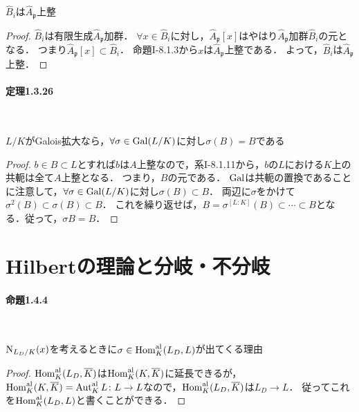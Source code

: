 \begin{screen}
  $\widehat{B}_i$は$\widehat{A}_\mathfrak{p}$上整
\end{screen}
\begin{proof}
  $\widehat{B}_i$は有限生成$\widehat{A}_\mathfrak{p}$加群．
  $\forall x\in\widehat{B}_i$に対し，$\widehat{A}_\mathfrak{p}[x]$はやはり$\widehat{A}_\mathfrak{p}$加群$\widehat{B}_i$の元となる．
  つまり$\widehat{A}_\mathfrak{p}[x]\subset\widehat{B}_i$．
  命題I-8.1.3から$x$は$\widehat{A}_\mathfrak{p}$上整である．
  よって，$\widehat{B}_i$は$\widehat{A}_\mathfrak{p}$上整．
\end{proof}

\paragraph{定理1.3.26}~
\begin{screen}
  \begin{lem}\label{sigmaB}
    $L/K$がGalois拡大なら，$\forall\sigma\in\operatorname{Gal}(L/K)$に対し$\sigma(B) = B$である
  \end{lem}
\end{screen}
\begin{proof}
  $b\in B\subset L$とすれば$b$は$A$上整なので，系I-8.1.11から，$b$の$L$における$K$上の共軛は全て$A$上整となる．
  つまり，$B$の元である．
  $\operatorname{Gal}$は共軛の置換であることに注意して，$\forall\sigma\in\operatorname{Gal}(L/K)$に対し$\sigma(B)\subset B$．
  両辺に$\sigma$をかけて$\sigma^2(B)\subset\sigma(B)\subset B$．
  これを繰り返せば，$B = \sigma^{[L:K]}(B)\subset\cdots\subset B$となる．従って，$\sigma B = B$．
\end{proof}

\section{Hilbertの理論と分岐・不分岐}
\paragraph{命題1.4.4}~
\begin{screen}
  $\operatorname{N}_{L_D/K}(x)$を考えるときに$\sigma\in\operatorname{Hom}_K^\text{al}(L_D, L)$が出てくる理由
\end{screen}
\begin{proof}
  $\operatorname{Hom}_K^\text{al}(L_D, \overline{K})$は$\operatorname{Hom}_K^\text{al}(K, \overline{K})$に延長できるが，$\operatorname{Hom}_K^\text{al}(K, \overline{K}) = \operatorname{Aut}_K^\text{al}L\colon L\to L$なので，$\operatorname{Hom}_K^\text{al}(L_D, \overline{K})$は$L_D\to L$．
  従ってこれを$\operatorname{Hom}_K^\text{al}(L_D, L)$と書くことができる．
\end{proof}

